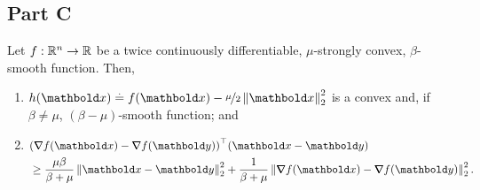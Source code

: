 \documentclass{tufte-handout}
\begin{document}
\subsection{Part C}
\begin{lem}\label{lem:part:1C}
Let $f : \mathbb{R}^n \to \mathbb{R}$ be a twice continuously differentiable, $\mu$-strongly convex, $\beta$-smooth function. Then, \begin{enumerate}
    \item $h(\vx) \defeq f(\vx) - \nicefrac{\mu}{2} \norm{\vx}_2^2$ is a convex and, if $\beta \neq \mu$, $(\beta-\mu)$-smooth function; and
    \item $\begin{aligned}[t]
            &\trans{(\grad f(\vx) - \grad f(\vy))}(\vx - \vy) \\
        &\geq \frac{\mu \beta}{\beta + \mu} \norm{\vx - \vy}_2^2 + \frac{1}{\beta + \mu} \norm{\grad f(\vx) - \grad f(\vy)}_2^2.
        \end{aligned}$
\end{enumerate}
\end{lem}
\end{document}
